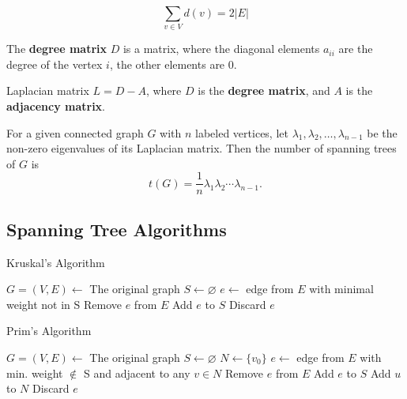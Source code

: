 \begin{lemma} 
\[\displaystyle 
\sum_{v \in V}^{} d(v) = 2 \vert E \vert
\]
\end{lemma}

\begin{definition}
The \textbf{degree matrix} $D$ is a matrix, where the diagonal elements $a_{ii}$ are the degree of the vertex $i$, the other elements are 0.
\end{definition}

\begin{definition}

Laplacian matrix $L = D - A$, where $D$ is the \textbf{degree matrix}, and $A$ is the \textbf{adjacency matrix}.

\end{definition}

\begin{theorem}
For a given connected graph $G$ with $n$ labeled vertices, let $\lambda_1, \lambda_2, \ldots, \lambda_{n-1}$ be the non-zero eigenvalues of its Laplacian matrix. Then the number of spanning trees of $G$ is 
\[
t(G)=\frac{1}{n} \lambda_1\lambda_2\cdots\lambda_{n-1}.
\]

\end{theorem}

\subsection{Spanning Tree Algorithms}

\begin{algorithm}[H]
\caption{Kruskal's Algorithm}
\begin{algorithmic}
\State $G = (V, E) \gets$ The original graph
\State $S \gets \varnothing$ 
    \State $e \gets$ edge from $E$ with minimal weight not in S
    \State Remove $e$ from $E$
        \State Add $e$ to $S$
    \Else
        \State Discard $e$
    \EndIf
\EndWhile
\end{algorithmic}
\end{algorithm}

\begin{algorithm}[H]
\caption{Prim's Algorithm}
\begin{algorithmic}
\State $G = (V, E) \gets$ The original graph
\State $S \gets \varnothing$ 
\State $N \gets \{v_0\}$ 
    \State $e \gets$ edge from $E$ with min. weight $\notin$ S and adjacent to any $v \in N$
    \State Remove $e$ from $E$
        \State Add $e$ to $S$
        \State Add $u$ to $N$
    \Else
        \State Discard $e$
    \EndIf
\EndWhile
\end{algorithmic}
\end{algorithm}

